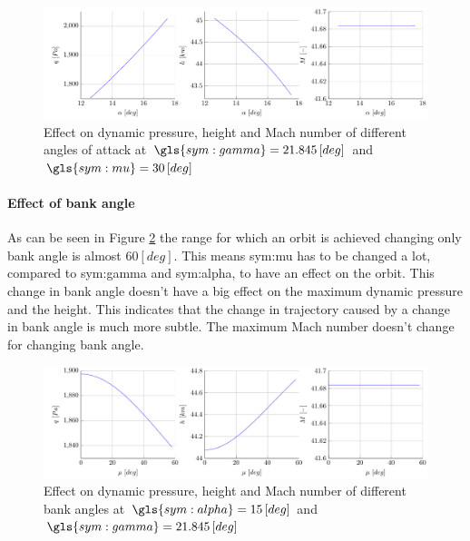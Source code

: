 \begin{figure}[h]
	\centering
	\includegraphics[width=\textwidth]{./Figure/orbit/effectalpha.pdf}
	\caption[Effect on dynamic pressure, height and Mach number of different angles of attack]{Effect on dynamic pressure, height and Mach number of different angles of attack at $\gls{sym:gamma}=21.845 \left[deg\right]$ and $\gls{sym:mu}=30 \left[deg\right]$}
	\label{fig:effectalpha}
\end{figure}

\paragraph{Effect of bank angle}

As can be seen in Figure \ref{fig:effectmu} the range for which an orbit is achieved changing only bank angle is almost $60 \left[deg\right]$. This means \gls{sym:mu} has to be changed a lot, compared to \gls{sym:gamma} and \gls{sym:alpha}, to have an effect on the orbit. This change in bank angle doesn't have a big effect on the maximum dynamic pressure and the height. This indicates that the change in trajectory caused by a change in bank angle is much more subtle. The maximum Mach number doesn't change for changing bank angle.

\begin{figure}[h]
	\centering
	\includegraphics[width=\textwidth]{./Figure/orbit/effectmu.pdf}
	\caption[Effect on dynamic pressure, height and Mach number of different bank angles]{Effect on dynamic pressure, height and Mach number of different bank angles at $\gls{sym:alpha}=15 \left[deg\right]$ and $\gls{sym:gamma}=21.845 \left[deg\right]$}
	\label{fig:effectmu}
\end{figure}